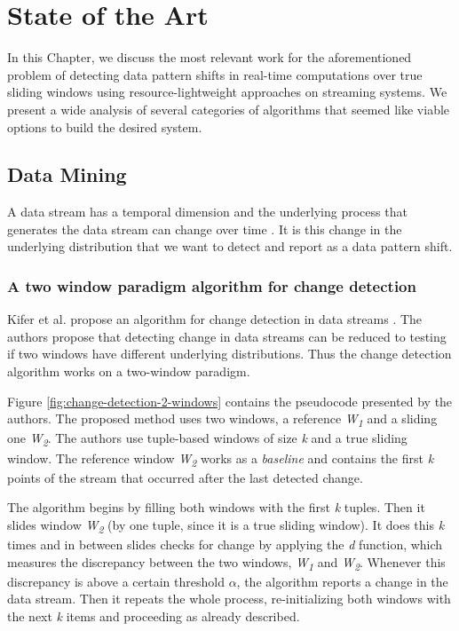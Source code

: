 \chapter{State of the Art} \label{chap:sota} \minitoc

In this Chapter, we discuss the most relevant work for the aforementioned problem of detecting data pattern shifts in real-time computations over true sliding windows using resource-lightweight approaches on streaming systems. We present a wide analysis of several categories of algorithms that seemed like viable options to build the desired system.

\section{Data Mining} \label{sec:change-detect}

A data stream has a temporal dimension and the underlying process that generates the data stream can change over time \cite{Aggarwal-Evolving-Data-Streams} \cite{Domingos-Mining-Time-Data-Streams}. It is this change in the underlying distribution that we want to detect and report as a data pattern shift.

\subsection{A two window paradigm algorithm for change detection}
\label{subsec:2-window}

Kifer et al. propose an algorithm for change detection in data streams \cite{Kifer-Detecting-Change}. The authors propose that detecting change in data streams can be reduced to testing if two windows have different underlying distributions. Thus the change detection algorithm works on a two-window paradigm.

Figure \ref{fig:change-detection-2-windows} contains the pseudocode presented by the authors. The proposed method uses two windows, a reference \textit{W\textsubscript{1}} and a sliding one \textit{W\textsubscript{2}}. The authors use tuple-based windows of size \textit{k} and a true sliding window. The reference window \textit{W\textsubscript{2}} works as a \textit{baseline} and contains the first \textit{k} points of the stream that occurred after the last detected change.

The algorithm begins by filling both windows with the first \textit{k} tuples. Then it slides window \textit{W\textsubscript{2}} (by one tuple, since it is a true sliding window). It does this \textit{k} times and in between slides checks for change by applying the \textit{d} function, which measures the discrepancy between the two windows, \textit{W\textsubscript{1}} and \textit{W\textsubscript{2}}. Whenever this discrepancy is above a certain threshold $\alpha$, the algorithm reports a change in the data stream. Then it repeats the whole process, re-initializing both windows with the next \textit{k} items and proceeding as already described. 

